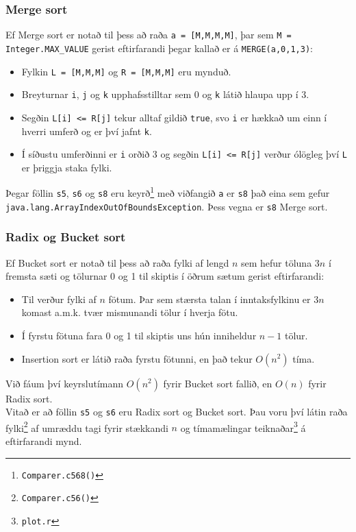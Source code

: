 \documentclass[a4paper,oneside]{article}
\begin{document}
\subsubsection{Merge sort}
Ef Merge sort er notað til þess að raða \texttt{a = [M,M,M,M]}, þar sem \texttt{M = Integer.MAX\_VALUE} gerist eftirfarandi þegar kallað er á \texttt{MERGE(a,0,1,3)}:\\
\begin{itemize}
    \item   Fylkin \texttt{L = [M,M,M]} og \texttt{R = [M,M,M]} eru mynduð.
    \item   Breyturnar \texttt{i}, \texttt{j} og \texttt{k} upphafsstilltar sem 0 og \texttt{k} látið hlaupa upp í 3.
    \item   Segðin \texttt{L[i] <= R[j]} tekur alltaf gildið \texttt{true}, svo \texttt{i} er hækkað um einn í hverri umferð og er því jafnt \texttt{k}.
    \item   Í síðustu umferðinni er \texttt{i} orðið 3 og segðin \texttt{L[i] <= R[j]} verður ólögleg því \texttt{L} er þriggja staka fylki.
\end{itemize}
Þegar föllin \texttt{s5}, \texttt{s6} og \texttt{s8} eru keyrð\footnote{\texttt{Comparer.c568()}} með viðfangið \texttt{a} er \texttt{s8} það eina sem gefur\\ \texttt{java.lang.ArrayIndexOutOfBoundsException}. Þess vegna er \texttt{s8} Merge sort.\\

\subsubsection{Radix og Bucket sort}
Ef Bucket sort er notað til þess að raða fylki af lengd $n$ sem hefur töluna $3n$ í fremsta sæti og tölurnar 0 og 1 til skiptis í öðrum sætum gerist eftirfarandi:
\begin{itemize}
    \item Til verður fylki af $n$ fötum. Þar sem stærsta talan í inntaksfylkinu er $3n$ komast a.m.k. tvær mismunandi tölur í hverja fötu.
    \item Í fyrstu fötuna fara 0 og 1 til skiptis uns hún inniheldur $n-1$ tölur.
    \item Insertion sort er látið raða fyrstu fötunni, en það tekur $O(n^2)$ tíma.
\end{itemize}
Við fáum því keyrslutímann $O(n^2)$ fyrir Bucket sort fallið, en $O(n)$ fyrir Radix sort.\\

\noindent Vitað er að föllin \texttt{s5} og \texttt{s6} eru Radix sort og Bucket sort. Þau voru því látin raða fylki\footnote{\texttt{Comparer.c56()}} af umræddu tagi fyrir stækkandi $n$ og tímamælingar teiknaðar\footnote{\texttt{plot.r}} á eftirfarandi mynd. \\
\end{document}
